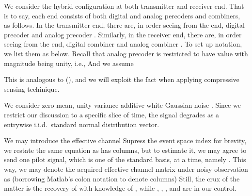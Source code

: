 We consider the hybrid configuration at both transmitter and receiver end.
That is to say, each end consists of both digital and analog percoders and combiners, as follows.
In the transmitter end, there are, in order seeing from the end, digital precoder  and analog precoder .
Similarly, in the receiver end, there are, in order seeing from the end, digital combiner  and analog combiner .
To set up notation, we list them as below.
%
%
Recall that analog precoder is restricted to have value with magnitude being unity, i.e.,
%
%
And we assume

This is analogous to (), and we will exploit the fact when applying compressive sensing techinique.

We consider zero-mean, unity-variance additive white Gaussian noise .
Since we restrict our discussion to a specific slice of time, the signal  degrades as a entrywise i.i.d.\ standard normal distribution vector.

We may introduce the effective channel
%
%
Supress the event space index for brevity, we restate the same equation as
%
 has  columns, but to estimate it, we may agree to send one pilot signal, which is one of the standard basis, at a time, namely .
This way, we may denote the acquired effective channel matrix  under noisy observation as (borrowing Matlab's colon notation to denote columns)
%
%
Still, the crux of the matter is the recovery of  with knowledge of , while , , , and  are in our control.

\stopsection
\startsection [title={Vectorization}]

